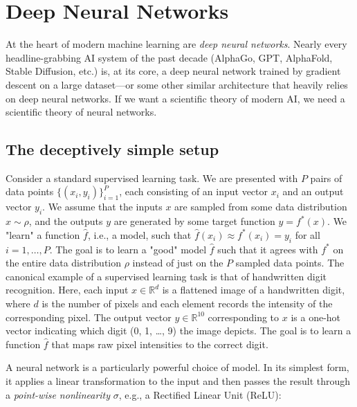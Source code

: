 
\section{Deep Neural Networks}

At the heart of modern machine learning are \textit{deep neural networks}. Nearly every headline-grabbing AI system of the past decade (AlphaGo, GPT, AlphaFold, Stable Diffusion, etc.) is, at its core, a deep neural network trained by gradient descent on a large dataset---or some other similar architecture that heavily relies on deep neural networks. If we want a scientific theory of modern AI, we need a scientific theory of neural networks.

\subsection{The deceptively simple setup}

Consider a standard supervised learning task. We are presented with $P$ pairs of data points $\{ (x_{i}, y_{i}) \}_{i=1}^P$, each consisting of an input vector $x_i$ and an output vector $y_i$. 
We assume that the inputs $x$ are sampled from some data distribution $x\sim \rho$, and
the outputs $y$ are generated by some target function $y=f^*(x)$.
We "learn" a function $\hat{f}$, i.e., a model, such that $\hat{f}(x_{i}) \approx f^*(x_i) = y_{i}$ for all $i = 1, \dots, P$. 
The goal is to learn a "good" model $\hat{f}$ such that it agrees with $f^*$ on
the entire data distribution $\rho$ instead of just on the $P$ sampled data points.
The canonical example of a supervised learning task is that of handwritten digit recognition. Here, each input $x\in \mathbb{R}^d$ is a flattened image of a handwritten digit, where $d$ is the number of pixels and each element records the intensity of the corresponding pixel. The output vector $y\in\mathbb{R}^{10}$ corresponding to $x$ is a one-hot vector indicating which digit (0, 1, \dots, 9) the image depicts. The goal is to learn a function $\hat{f}$ that maps raw pixel intensities to the correct digit.

A neural network is a particularly powerful choice of model. In its simplest form, it applies a linear transformation to the input and then passes the result through a \textit{point-wise nonlinearity} $\sigma$, e.g., a Rectified Linear Unit (ReLU):

